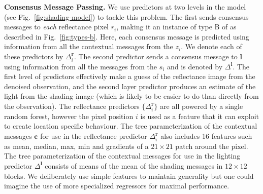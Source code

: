 \textbf{Consensus Message Passing.} We use predictors at two levels in the model (see Fig.~\ref{fig:shading-model}) to tackle this problem. The first sends consensus messages to \textit{each} reflectance pixel $r_i$, making it an instance of type B of \MTD as described in Fig.~\ref{fig:types-b}. Here, each consensus message is predicted using information from all the contextual messages from the $z_i$. We denote each of these predictors by $\Delta_i^\mathbf{r}$. The second predictor sends a consensus message to $\mathbf{l}$ using information from all the messages from the $s_i$ and is denoted by $\Delta^\mathbf{l}$. The first level of predictors effectively make a guess of the reflectance image from the denoised observation, and the second layer predictor produces an estimate of the light from the shading image (which is likely to be easier to do than directly from the observation). The reflectance predictors $\{ \Delta_i^\mathbf{r} \}$ are all powered by a single random forest, however the pixel position $i$ is used as a feature that it can exploit to create location specific behaviour. The tree parameterization of the contextual messages $\mathbf{c}$ for use in the reflectance predictor $\Delta_i^\mathbf{r}$ also includes 16 features such as mean, median, max, min and gradients of a $21 \times 21$ patch around the pixel. The tree parameterization of the contextual messages for use in the lighting predictor $\Delta^\mathbf{l}$ consists of means of the mean of the shading messages in $12 \times 12$ blocks. We deliberately use simple features to maintain generality but one could imagine the use of more specialized regressors for maximal performance.

